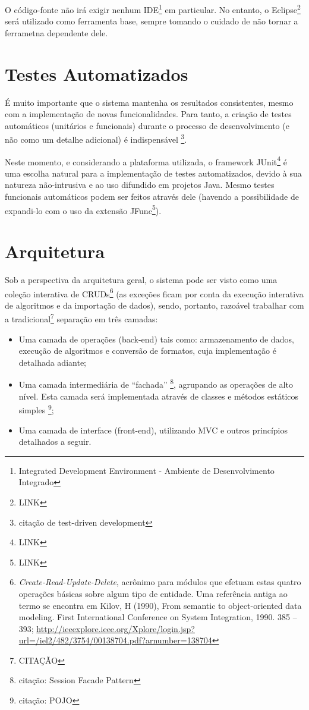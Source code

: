 \documentclass[11pt]{book}
\begin{document}
O código-fonte não irá exigir nenhum IDE\footnote{Integrated Development Environment - Ambiente de Desenvolvimento Integrado} em particular. No entanto, o Eclipse\footnote{LINK} será utilizado como ferramenta base, sempre tomando o cuidado de não tornar a ferrametna dependente dele. 

\section{Testes Automatizados}

É muito importante que o sistema mantenha os resultados consistentes, mesmo com a implementação de novas funcionalidades. Para tanto, a criação de testes automáticos (unitários e funcionais) durante o processo de desenvolvimento (e não como um detalhe adicional) é indispensável \footnote{citação de test-driven development}.

Neste momento, e considerando a plataforma utilizada, o framework JUnit\footnote{LINK} é uma escolha natural para a implementação de testes automatizados, devido à sua natureza não-intrusiva e ao uso difundido em projetos Java. Mesmo testes funcionais automáticos podem ser feitos através dele (havendo a possibilidade de expandi-lo com o uso da extensão JFunc\footnote{LINK}).

\section{Arquitetura}

Sob a perspectiva da arquitetura geral, o sistema pode ser visto como uma coleção interativa de CRUDs\footnote{\textit{Create-Read-Update-Delete}, acrônimo para módulos que efetuam estas quatro operações básicas sobre algum tipo de entidade. Uma referência antiga ao termo se encontra em Kilov, H (1990), From semantic to object-oriented data modeling. First International Conference on System Integration, 1990. 385 – 393; \url{http://ieeexplore.ieee.org/Xplore/login.jsp?url=/iel2/482/3754/00138704.pdf?arnumber=138704}} (as exceções ficam por conta da execução interativa de algoritmos e da importação de dados), sendo, portanto, razoável trabalhar com a tradicional\footnote{CITAÇÃO} separação em três camadas:

\begin{itemize}
\item Uma camada de operações (back-end) tais como: armazenamento de dados, execução de algoritmos e conversão de formatos, cuja implementação é detalhada adiante;

\item Uma camada intermediária de “fachada” \footnote{citação: Session Facade Pattern}, agrupando as operações de alto nível. Esta camada será implementada através de classes e métodos estáticos simples \footnote{citação: POJO};

\item Uma camada de interface (front-end), utilizando MVC e outros princípios detalhados a seguir.
\end{itemize}
\end{document}
